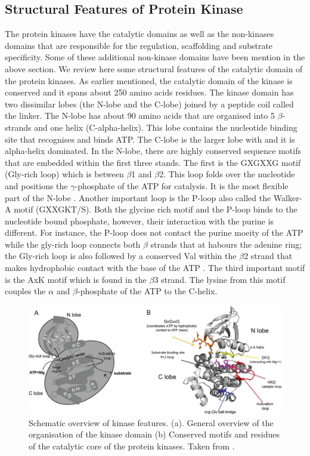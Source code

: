 \documentclass[a4paper, 11pt]{article}
\begin{document}
\subsection*{Structural Features of Protein Kinase}
The protein kinases have the catalytic domains as well as the non-kinases domains that are responsible for the regulation, scaffolding and substrate specificity. Some of these additional non-kinase domains have been mention in the above section. We review here some structural features of the catalytic domain of the protein kinases. As earlier mentioned, the catalytic domain of the kinase is conserved and it spans about 250 amino acids residues. The kinase domain has two dissimilar lobes (the N-lobe and the C-lobe) joined by a peptide coil called the linker. The N-lobe has about 90 amino acids that are organised into 5 $\beta$-strands and one helix (C-alpha-helix). This lobe contains the nucleotide binding site that recognises and binds ATP. The C-lobe is the larger lobe with and it is alpha-helix dominated. In the N-lobe, there are highly conserved sequence motifs that are embedded within the first three stands. The first is the GXGXXG motif (Gly-rich loop) which is between $\beta$1 and $\beta$2. This loop folds over the nucleotide and positions the  $\gamma$-phosphate of the ATP for catalysis. It is the most flexible part of the N-lobe \cite{taylor2011protein}. Another important loop is the P-loop also called the Walker-A motif (GXXGKT/S). Both the glycine rich motif and the P-loop binds to the nucleotide bound phosphate, however, their interaction with the purine is different. For instance, the P-loop does not contact the purine moeity of the ATP while the gly-rich loop connects both $\beta$ strands that at habours the adenine ring; the Gly-rich loop is also followed by a conserved Val within the $\beta$2 strand that makes hydrophobic contact with the base of the ATP \cite{fabbro2015ten}. The third important motif is the AxK motif which is found in the $\beta$3 strand. The lysine from this motif couples the $\alpha$ and $\beta$-phosphate of the ATP to the C-helix. \\
\begin{figure}[H]
	\includegraphics[width=\linewidth]{figures/kinasedom.jpg}
	\centering
	\caption{Schematic overview of kinase features. (a). General overview of the organisation of the kinase domain (b) Conserved motifs and residues of the catalytic core of the protein kinases. Taken from \cite{lorenzen2014hdx}.}
	\label{kinasedoms}
\end{figure}
\end{document}
